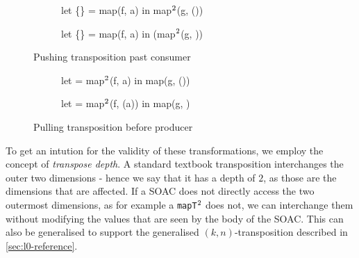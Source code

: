 \begin{figure}
\begin{subfigure}[t]{.5\textwidth}
\begin{colorcode}
let \{\} = map(f, a) in
map\(^{2}\)(g, ())
\end{colorcode}
\end{subfigure}%
\begin{subfigure}[t]{.5\textwidth}
\begin{colorcode}
let \{\} = map(f, a) in
(map\(^{2}\)(g, ))
\end{colorcode}
\end{subfigure}

\caption{Pushing transposition past consumer}
\label{fig:fuse-across-transpose}
\end{figure}

\begin{figure}
\begin{subfigure}[t]{.5\textwidth}
\begin{colorcode}
let  = map\(^{2}\)(f, a) in
map(g, ())
\end{colorcode}
\end{subfigure}%
\begin{subfigure}[t]{.5\textwidth}
\begin{colorcode}
let  = map\(^{2}\)(f, (a)) in
map(g, )
\end{colorcode}
\end{subfigure}

\caption{Pulling transposition before producer}
\label{fig:pull-transpose}
\end{figure}

To get an intution for the validity of these transformations, we
employ the concept of \textit{transpose depth}.  A standard textbook
transposition interchanges the outer two dimensions - hence we say
that it has a depth of $2$, as those are the dimensions that are
affected.  If a SOAC does not directly access the two outermost
dimensions, as for example a \texttt{mapT$^{2}$} does not, we
can interchange them without modifying the values that are seen by the
body of the SOAC.  This can also be generalised to support the
generalised $(k,n)$-transposition described in \cref{sec:l0-reference}.

